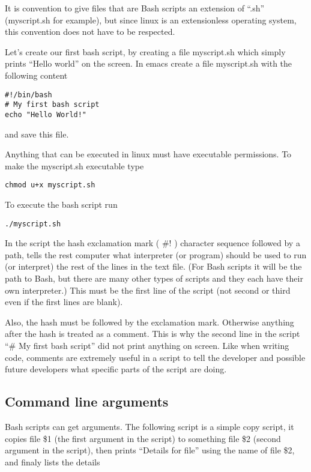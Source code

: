 \documentclass[aps,showpacs,prd,notitlepage,preprintnumbers,amsmath,amssymb,letterpaper]{revtex4}
\begin{document}
It is convention to give files that are Bash scripts an extension of
``.sh'' (myscript.sh for example), but since linux is an extensionless
operating system, this convention does not have to be respected.

Let's create our first bash script, by creating a file myscript.sh
which simply prints ``Hello world'' on the screen. In emacs create a
file myscript.sh with the following content
\begin{verbatim}
#!/bin/bash
# My first bash script
echo "Hello World!"
\end{verbatim}
and save this file.

Anything that can be executed in linux must have executable permissions. To make the myscript.sh executable type

\begin{verbatim}
chmod u+x myscript.sh
\end{verbatim}

To execute the bash script run

\begin{verbatim}
./myscript.sh
\end{verbatim}

In the script the hash exclamation mark ( \#! ) character sequence
followed by a path, tells the rest computer what interpreter (or
program) should be used to run (or interpret) the rest of the lines in
the text file. (For Bash scripts it will be the path to Bash, but
there are many other types of scripts and they each have their own
interpreter.) This must be the first line of the script (not second
or third even if the first lines are blank).

Also, the hash must be followed by the exclamation mark. Otherwise
anything after the hash is treated as a comment. This is why the
second line in the script ``\# My first bash script'' did not print
anything on screen. Like when writing code, comments are extremely
useful in a script to tell the developer and possible future
developers what specific parts of the script are doing.

\subsection{Command line arguments}

Bash scripts can get arguments. The following script
is a simple copy script, it copies file \$1 (the first argument
in the script) to something file \$2 (second argument in the script),
then prints ``Details for file'' using the name of file \$2, and finaly
lists the details
\end{document}
